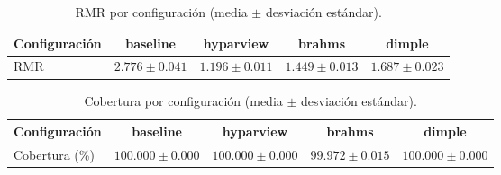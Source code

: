 \begin{table}[h]
\centering
\caption{RMR por configuración (media $\pm$ desviación estándar).}
\begin{tabular}{lcccc}
\hline
Configuración & baseline & hyparview & brahms & dimple \\
\hline
RMR & $2.776 \pm 0.041$ & $1.196 \pm 0.011$ & $1.449 \pm 0.013$ & $1.687 \pm 0.023$ & \\
\hline
\end{tabular}
\end{table}

\begin{table}[h]
\centering
\caption{Cobertura por configuración (media $\pm$ desviación estándar).}
\begin{tabular}{lcccc}
\hline
Configuración & baseline & hyparview & brahms & dimple \\
\hline
Cobertura (\%) & $100.000 \pm 0.000$ & $100.000 \pm 0.000$ & $99.972 \pm 0.015$ & $100.000 \pm 0.000$ & \\
\hline
\end{tabular}
\end{table}
